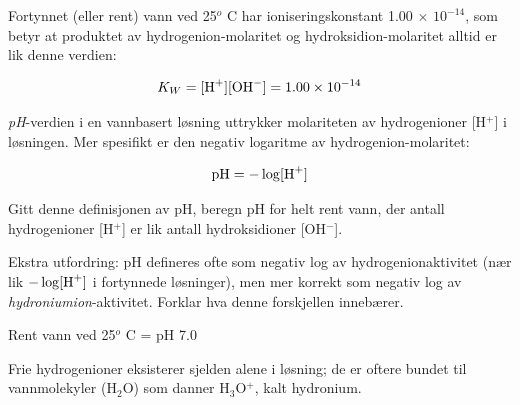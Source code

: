 

Fortynnet (eller rent) vann ved 25$^{o}$ C har ioniseringskonstant 1.00 $\times$ $10^{-14}$, som betyr at produktet av hydrogenion-molaritet og hydroksidion-molaritet alltid er lik denne verdien:

$$K_W = [\hbox{H}^{+}] [\hbox{OH}^{-}] = 1.00 \times 10^{-14}$$

{\it pH}-verdien i en vannbasert løsning uttrykker molariteten av hydrogenioner [H$^{+}$] i løsningen. Mer spesifikt er den negativ logaritme av hydrogenion-molaritet:

$$\hbox{pH} = - \log [\hbox{H}^{+}]$$

Gitt denne definisjonen av pH, beregn pH for helt rent vann, der antall hydrogenioner [H$^{+}$] er lik antall hydroksidioner [OH$^{-}$].

\vskip 10pt

Ekstra utfordring: pH defineres ofte som negativ log av hydrogenionaktivitet (nær lik $-\log [\hbox{H}^{+}]$ i fortynnede løsninger), men mer korrekt som negativ log av {\it hydroniumion}-aktivitet. Forklar hva denne forskjellen innebærer.







Rent vann ved 25$^{o}$ C = pH 7.0

\vskip 10pt

Frie hydrogenioner eksisterer sjelden alene i løsning; de er oftere bundet til vannmolekyler (H$_{2}$O) som danner H$_{3}$O$^{+}$, kalt hydronium.










